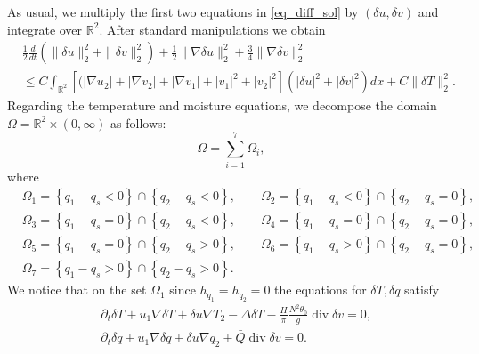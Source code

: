 \documentclass[11pt, a4paper, article,reqno,]{amsart}
\theoremstyle{remark}
\DeclareMathOperator{\dive}{div}
\numberwithin{equation}{section}
\begin{document}
As usual, we multiply the first two equations in \eqref{eq_diff_sol} by $(\delta u, \delta v)$ and integrate over $\mathbb{R}^2$. After standard manipulations we obtain 
\begin{equation}\label{pt_1}
    \begin{aligned}
        & \frac{1}{2} \frac{d}{dt} \left( \|\delta u\|_2^2 + \|\delta v\|_2^2  \right) + \frac{1}{2}\|\nabla \delta u\|_2^2 + \frac{3}{4}\|\nabla \delta v\|_2^2 \\
        & \leq C \int_{\mathbb{R}^2}[(|\nabla u_2|+ |\nabla v_2| + |\nabla v_1| + |v_1|^2 + |v_2|^2] (|\delta u|^2 + |\delta v|^2)  dx + C \|\delta T\|_2^2.
    \end{aligned}
\end{equation}
Regarding the temperature and moisture equations, we decompose the domain $\Omega = \mathbb{R}^2 \times (0,\infty)$ as follows:
\begin{equation*}
    \Omega = \sum_{i=1}^7\Omega_i,
\end{equation*}
where
\begin{equation*}
\begin{aligned}
   &\Omega_1  = \left\{ q_1 - q_s < 0 \right\} \cap \left\{ q_2 - q_s < 0 \right\},\qquad \Omega_2=   \left\{ q_1 - q_s < 0 \right\} \cap \left\{ q_2 - q_s = 0 \right\}, \\
   &\Omega_3=   \left\{ q_1 - q_s = 0 \right\} \cap \left\{ q_2 - q_s < 0 \right\}, \qquad \Omega_4 =   \left\{ q_1 - q_s = 0 \right\} \cap \left\{ q_2 - q_s = 0 \right\}, \\
   & \Omega_5=   \left\{ q_1 - q_s = 0 \right\} \cap \left\{ q_2 - q_s > 0 \right\}, \qquad \Omega_6=   \left\{ q_1 - q_s > 0 \right\} \cap \left\{ q_2 - q_s = 0 \right\},\\
   &\Omega_7=   \left\{ q_1 - q_s > 0 \right\} \cap \left\{ q_2 - q_s > 0 \right\}.
\end{aligned}
\end{equation*}
We notice that on the set $\Omega_1$ since $h_{q_1} = h_{q_2}=0$ the equations for $\delta T, \delta q$ satisfy
\begin{equation}\label{delta_ome_1}
    \begin{aligned}
        & \partial_t \delta T + u_1 \nabla \delta T + \delta u \nabla T_{2} - \Delta \delta T - \frac{H}{\pi}\frac{N^2 \theta_0}{g} \dive  \delta v=0, \\
        & \partial_t \delta q + u_1 \nabla \delta q + \delta u \nabla q_2 + \bar{Q} \dive \delta v  =0.
    \end{aligned}
\end{equation}
\end{document}
